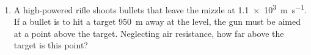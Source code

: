 \documentclass{../../../oss-apphys}
\begin{document}
\begin{enumerate}[leftmargin=15pt]
\item A high-powered rifle shoots bullets that leave the mizzle at
  \SI{1.1e3}{\metre\per\second}. If a bullet is to hit a target
  \SI{950}{\metre} away at the level, the gun must be aimed at a point above
  the target. Neglecting air resistance, how far above the target is this
  point?

  
\end{enumerate}
\end{document}
